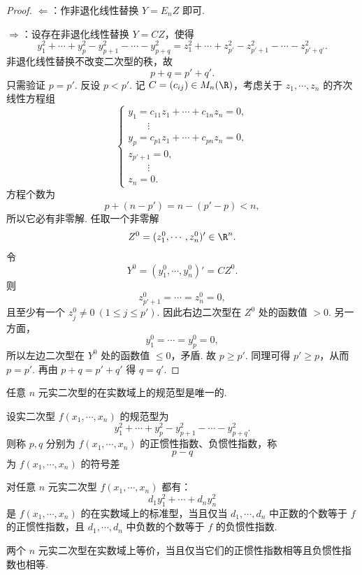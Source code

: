 \begin{proof}
	$\Leftarrow$：作非退化线性替换 $Y=E_nZ$ 即可.
	
	$\Rightarrow$：设存在非退化线性替换 $Y=CZ$，使得
	\[
	y_1^2+\cdots+y_p^2-y_{p+1}^2-\cdots-y_{p+q}^2
	=
	z_1^2+\cdots+z_{p'}^2-z_{p'+1}^2-\cdots-z_{p'+q'}^2.
	\]
	非退化线性替换不改变二次型的秩，故
	\[
	p+q=p'+q'.
	\]
	只需验证 $p=p'$. 反设 $p<p'$. 记 $C=(c_{ij})\in M_n(\R)$，考虑关于 $z_1,\cdots,z_n$ 的齐次线性方程组
	\[
	\begin{cases}
		y_1=c_{11}z_1+\cdots+c_{1n}z_n=0,\\
		\qquad\vdots\\
		y_p=c_{p1}z_1+\cdots+c_{pn}z_n=0,\\
		z_{p'+1}=0,\\
		\qquad\vdots\\
		z_n=0.
	\end{cases}
	\]
	方程个数为
	\[
	p+(n-p')=n-(p'-p)<n,
	\]
	所以它必有非零解. 任取一个非零解
	\[
	Z^0=(z_1^0,\cdots,z_n^0)'\in\R^n.
	\]
	令
	\[
	Y^0=(y_1^0,\cdots,y_n^0)'=CZ^0.
	\]
	则
	\[
	z_{p'+1}^0=\cdots=z_n^0=0,
	\]
	且至少有一个 $z_j^0\ne0\ (1\le j\le p')$. 因此右边二次型在 $Z^0$ 处的函数值 $>0$. 另一方面，
	\[
	y_1^0=\cdots=y_p^0=0,
	\]
	所以左边二次型在 $Y^0$ 处的函数值 $\le0$，矛盾. 故 $p\ge p'$. 同理可得 $p'\ge p$，从而 $p=p'$. 再由 $p+q=p'+q'$ 得 $q=q'$.
\end{proof}

\begin{corollary}
	任意 $n$ 元实二次型的在实数域上的规范型是唯一的.
\end{corollary}

\begin{definition}
	设实二次型 $f(x_1,\cdots,x_n)$ 的规范型为
	\[
	y_1^2+\cdots+y_p^2-y_{p+1}^2-\cdots-y_{p+q}^2.
	\]
	则称 $p,q$ 分别为 $f(x_1,\cdots,x_n)$ 的正惯性指数、负惯性指数，称
	\[
	p-q
	\]
	为 $f(x_1,\cdots,x_n)$ 的符号差
\end{definition}

\begin{corollary}
	对任意 $n$ 元实二次型 $f(x_1,\cdots,x_n)$ 都有：
	\[
	d_1y_1^2+\cdots+d_ny_n^2
	\]
	是 $f(x_1,\cdots,x_n)$ 的在实数域上的标准型，当且仅当 $d_1,\cdots,d_n$ 中正数的个数等于 $f$ 的正惯性指数，且 $d_1,\cdots,d_n$ 中负数的个数等于 $f$ 的负惯性指数.
\end{corollary}

\begin{corollary}
	两个 $n$ 元实二次型在实数域上等价，当且仅当它们的正惯性指数相等且负惯性指数也相等.
\end{corollary}

